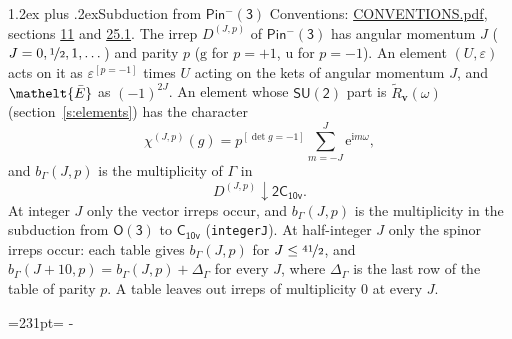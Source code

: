 \documentclass[10pt,a4paper]{article}
\makeatletter
\renewcommand\section{\@startsection{section}{1}{\z@}{-3ex plus -1ex minus -.2ex}%
  {1.2ex plus .2ex}{\normalfont\large\sffamily\bfseries\color{parttitle}}}
\newcommand{\needspace}[1]{\par\penalty-100\begingroup\dimen0=#1\relax\dimen2=\pagegoal
  \advance\dimen2-\pagetotal\ifdim\dimen0>\dimen2\relax\ifdim\dimen2>0pt\vfil\break\fi\fi
  \endgroup}
\numberwithin{equation}{section}
\newcommand{\eltfont}[1]{{\let\sigma\eltsigma\mathelt{#1}}}
\newcommand{\grp}[1]{\mathsf{#1}}
\newcommand{\elt}[1]{\eltfont{#1}}
\newcommand{\ptag}[1]{\mathrm{#1}}
\newcommand{\iverson}[1]{[#1]}
\newcommand{\restr}[2]{#1\!\downarrow#2}
\newcommand{\vv}{\mathbf{v}}
\newcommand{\iunit}{\mathrm{i}}
\newcommand{\expe}{\mathrm{e}}
\newcommand{\irrJp}[2]{D^{(#1,#2)}}
\newcommand{\barred}[1]{\bar{#1}}
\newcommand{\lift}[1]{\tilde{#1}}
\makeatother
\begin{document}
\section{Subduction from \texorpdfstring{$\grp{Pin^{-}(3)}$}{Pin(3)}}\label{s:subduction_parent}
Conventions: \href{../../CONVENTIONS.pdf}{CONVENTIONS.pdf}, sections \href{../../../rotation/CONVENTIONS.pdf\#conv.11}{11} and \href{../../CONVENTIONS.pdf\#conv.25.1}{25.1}.
\leavevmode\label{n:index.J}\label{n:index.parity}\label{n:irrep.o3}The irrep $\irrJp{J}{p}$ of \href{Pinminus3.pdf}{$\grp{Pin^{-}(3)}$} has angular momentum $J$ ($J = 0, \nicefrac{1}{2}, 1, \dots$) and parity $p$ ($\ptag{g}$ for $p = +1$, $\ptag{u}$ for $p = -1$). An element $(U, \varepsilon)$ acts on it as $\varepsilon^{[p = -1]}$ times $U$ acting on the kets of angular momentum $J$, and $\elt{\barred{E}}$ as $(-1)^{2J}$. \label{n:function.character.parent}\label{n:function.multiplicity}An element whose $\grp{SU(2)}$ part is $\lift{R}_{\vv}(\omega)$ (section~\ref{s:elements}) has the character
\begin{equation}\label{e:chi}\chi^{(J,p)}(g) = p^{\iverson{\det g = -1}}\sum_{m=-J}^{J} \expe^{\iunit m\omega},\end{equation}
and $b_\Gamma(J, p)$ is the multiplicity of $\Gamma$ in
\begin{equation}\label{e:parent}\restr{\irrJp{J}{p}}{\grp{2C_{10v}}}.\end{equation}
At integer $J$ only the vector irreps occur, and $b_\Gamma(J, p)$ is the multiplicity in the subduction from $\grp{O(3)}$ to \href{../../../rotation/data/pdf/C10v.pdf}{$\grp{C_{10v}}$} (\texttt{integerJ}). \label{n:index.increment}At half-integer $J$ only the spinor irreps occur: each table gives $b_\Gamma(J, p)$ for $J \le \nicefrac{41}{2}$, and $b_\Gamma(J + 10, p) = b_\Gamma(J, p) + \Delta_\Gamma$ for every $J$, where $\Delta_\Gamma$ is the last row of the table of parity $p$. A table leaves out irreps of multiplicity 0 at every $J$.
\needspace{231pt}
\end{document}
